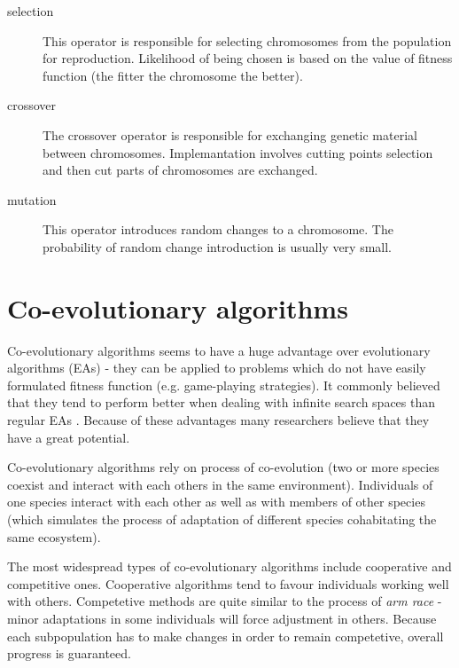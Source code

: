\begin{description}

\item[selection]
  This operator is responsible for selecting chromosomes from the population for reproduction.
  Likelihood of being chosen is based on the value of fitness function (the fitter the chromosome the better).
  
\item[crossover]
  The crossover operator is responsible for exchanging genetic material between chromosomes.
  Implemantation involves cutting points selection and then cut parts of chromosomes are exchanged.

\item[mutation]
  This operator introduces random changes to a chromosome.
  The probability of random change introduction is usually very small.  

\end{description}


\section{Co-evolutionary algorithms}
\label{sec:co-evol}

Co-evolutionary algorithms seems to have a huge advantage over evolutionary algorithms (EAs) - they can be applied to problems which do not have easily formulated 
fitness function (e.g. game-playing strategies).
It commonly believed that they tend to perform better when dealing with infinite search spaces than regular EAs \cite{co-evol}.
Because of these advantages many researchers believe that they have a great potential.

Co-evolutionary algorithms rely on process of co-evolution (two or more species coexist and interact with each others in the same environment).
Individuals of one species interact with each other as well as with members of other species (which simulates the process of adaptation of different species cohabitating the same 
ecosystem).

The most widespread types of co-evolutionary algorithms include cooperative and competitive ones.
Cooperative algorithms tend to favour individuals working well with others.
Competetive methods are quite similar to the process of \emph{arm race} - minor adaptations in some individuals will force adjustment in others.
Because each subpopulation has to make changes in order to remain competetive, overall progress is guaranteed. 
  
